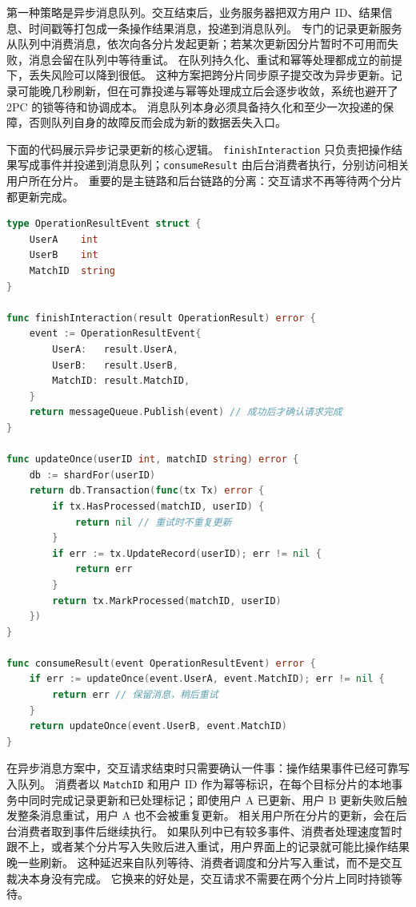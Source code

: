 第一种策略是异步消息队列。交互结束后，业务服务器把双方用户 ID、结果信息、时间戳等打包成一条操作结果消息，投递到消息队列。
专门的记录更新服务从队列中消费消息，依次向各分片发起更新；若某次更新因分片暂时不可用而失败，消息会留在队列中等待重试。
在队列持久化、重试和幂等处理都成立的前提下，丢失风险可以降到很低。
这种方案把跨分片同步原子提交改为异步更新。记录可能晚几秒刷新，但在可靠投递与幂等处理成立后会逐步收敛，系统也避开了 2PC 的锁等待和协调成本。
消息队列本身必须具备持久化和至少一次投递的保障，否则队列自身的故障反而会成为新的数据丢失入口。

下面的代码展示异步记录更新的核心逻辑。
\texttt{finishInteraction} 只负责把操作结果写成事件并投递到消息队列；\texttt{consumeResult} 由后台消费者执行，分别访问相关用户所在分片。
重要的是主链路和后台链路的分离：交互请求不再等待两个分片都更新完成。

\begin{tcolorbox}[title=异步记录更新的核心逻辑]
\begin{lstlisting}[style=codeblock, language=go]
type OperationResultEvent struct {
    UserA    int
    UserB    int
    MatchID  string
}

func finishInteraction(result OperationResult) error {
    event := OperationResultEvent{
        UserA:   result.UserA,
        UserB:   result.UserB,
        MatchID: result.MatchID,
    }
    return messageQueue.Publish(event) // 成功后才确认请求完成
}

func updateOnce(userID int, matchID string) error {
    db := shardFor(userID)
    return db.Transaction(func(tx Tx) error {
        if tx.HasProcessed(matchID, userID) {
            return nil // 重试时不重复更新
        }
        if err := tx.UpdateRecord(userID); err != nil {
            return err
        }
        return tx.MarkProcessed(matchID, userID)
    })
}

func consumeResult(event OperationResultEvent) error {
    if err := updateOnce(event.UserA, event.MatchID); err != nil {
        return err // 保留消息，稍后重试
    }
    return updateOnce(event.UserB, event.MatchID)
}
\end{lstlisting}
\end{tcolorbox}

在异步消息方案中，交互请求结束时只需要确认一件事：操作结果事件已经可靠写入队列。
消费者以 \texttt{MatchID} 和用户 ID 作为幂等标识，在每个目标分片的本地事务中同时完成记录更新和已处理标记；即使用户 A 已更新、用户 B 更新失败后触发整条消息重试，用户 A 也不会被重复更新。
相关用户所在分片的更新，会在后台消费者取到事件后继续执行。
如果队列中已有较多事件、消费者处理速度暂时跟不上，或者某个分片写入失败后进入重试，用户界面上的记录就可能比操作结果晚一些刷新。
这种延迟来自队列等待、消费者调度和分片写入重试，而不是交互裁决本身没有完成。
它换来的好处是，交互请求不需要在两个分片上同时持锁等待。

